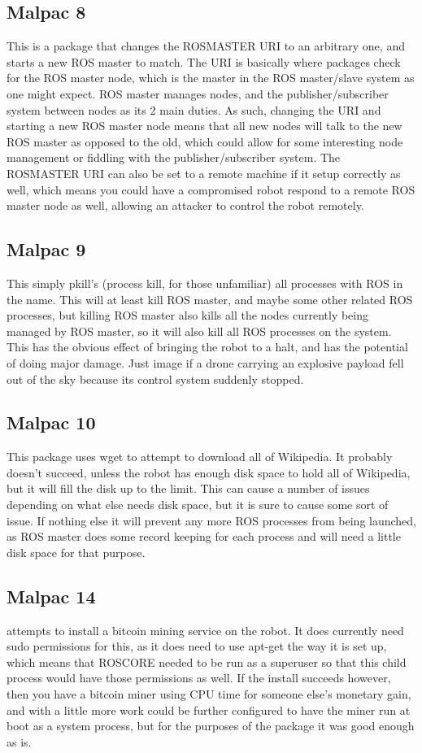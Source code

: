 \documentclass[IEEEtran,letterpaper,10pt,notitlepage,draftclsnofoot,onecolumn]{article}
\begin{document}
\subsection{Malpac 8}
This is a package that changes the ROSMASTER URI to an arbitrary one, and starts a new ROS master to match.
The URI is basically where packages check for the ROS master node, which is the master in the ROS master/slave system as one might expect.
ROS master manages nodes, and the publisher/subscriber system between nodes as its 2 main duties.
As such, changing the URI and starting a new ROS master node means that all new nodes will talk to the new ROS master as opposed to the old, which could allow for some interesting node management or fiddling with the publisher/subscriber system.
The ROSMASTER URI can also be set to a remote machine if it setup correctly as well, which means you could have a compromised robot respond to a remote ROS master node as well, allowing an attacker to control the robot remotely.

\subsection{Malpac 9}
This simply pkill’s (process kill, for those unfamiliar) all processes with ROS in the name.
This will at least kill ROS master, and maybe some other related ROS processes, but killing ROS master also kills all the nodes currently being managed by ROS master, so it will also kill all ROS processes on the system.
This has the obvious effect of bringing the robot to a halt, and has the potential of doing major damage.
Just image if a drone carrying an explosive payload fell out of the sky because its control system suddenly stopped.

\subsection{Malpac 10}
This package uses wget to attempt to download all of Wikipedia.
It probably doesn’t succeed, unless the robot has enough disk space to hold all of Wikipedia, but it will fill the disk up to the limit.
This can cause a number of issues depending on what else needs disk space, but it is sure to cause some sort of issue.
If nothing else it will prevent any more ROS processes from being launched, as ROS master does some record keeping for each process and will need a little disk space for that purpose.

\subsection{Malpac 14}
attempts to install a bitcoin mining service on the robot.
It does currently need sudo permissions for this, as it does need to use apt-get the way it is set up, which means that ROSCORE needed to be run as a superuser so that this child process would have those permissions as well.
If the install succeeds however, then you have a bitcoin miner using CPU time for someone else’s monetary gain, and with a little more work could be further configured to have the miner run at boot as a system process, but for the purposes of the package it was good enough as is.
\end{document}
